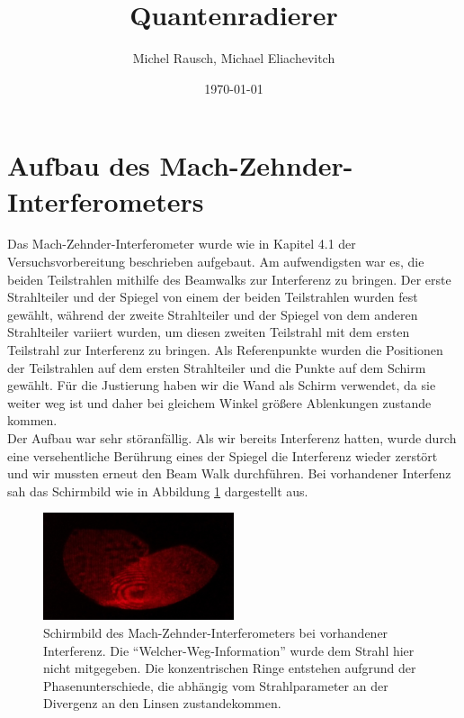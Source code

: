\documentclass[a4paper,ngerman]{scrartcl}
\title{Quantenradierer}
\date{\today}
\author{Michel Rausch, Michael Eliachevitch}
\begin{document}
\maketitle
\tableofcontents
\clearpage

\section{Aufbau des Mach-Zehnder-Interferometers}
\label{sec:aufbau}
Das Mach-Zehnder-Interferometer wurde wie in Kapitel 4.1 der Versuchsvorbereitung beschrieben aufgebaut. 
Am aufwendigsten war es, die beiden Teilstrahlen mithilfe des Beamwalks zur Interferenz zu bringen.
Der erste Strahlteiler und der Spiegel von einem der beiden Teilstrahlen wurden fest gewählt, während 
der zweite Strahlteiler und der Spiegel von dem anderen Strahlteiler variiert wurden, um diesen zweiten Teilstrahl 
mit dem ersten Teilstrahl zur Interferenz zu bringen. Als Referenpunkte wurden die Positionen der Teilstrahlen 
auf dem ersten Strahlteiler und die Punkte auf dem Schirm gewählt. Für die Justierung haben wir die Wand als Schirm verwendet,
da sie weiter weg ist und daher bei gleichem Winkel größere Ablenkungen zustande kommen.\\

Der Aufbau war sehr störanfällig. Als wir bereits Interferenz hatten, wurde durch eine versehentliche Berührung eines der Spiegel 
die Interferenz wieder zerstört und wir mussten erneut den Beam Walk durchführen. Bei vorhandener Interfenz sah das Schirmbild wie 
in Abbildung \ref{fig:interferenz} dargestellt aus.

\begin{figure}[tbh!]
  \centering
  \includegraphics[width=0.5\textwidth]{fotos/interferenz_zugeschnitten.jpg}
  \caption{Schirmbild des Mach-Zehnder-Interferometers bei vorhandener Interferenz. Die "`Welcher-Weg-Information"' wurde dem Strahl hier nicht mitgegeben. Die konzentrischen Ringe entstehen aufgrund der Phasenunterschiede, die abhängig vom Strahlparameter an der Divergenz an den Linsen zustandekommen.}
  \label{fig:interferenz}
\end{figure}
\end{document}
